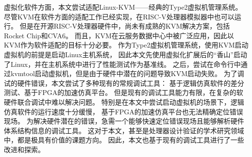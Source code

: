 虚拟化软件方面，本文尝试适配Linux-KVM——经典的Type2虚拟机管理系统。
尽管KVM在软件方面的适配工作已经实现，在RISC-V处理器模拟器中也可以运行。
但是在开源RISC-V处理器硬件中，尚未有成熟的KVM解决方案，包括Rocket Chip和CVA6。
而且，KVM在云服务数据中心中被广泛应用，因此以KVM作为软件适配的目标十分必要。
作为Type2虚拟机管理系统，使用KVM启动虚拟机的前提是启动Linux主机系统，
因此本文先使用虚拟化扩展后的“香山”启动了Linux，并在主机系统中进行了性能测试作为基准线。
之后，尝试在命令行中通过kvmtool启动虚拟机，但是由于硬件中潜在的问题导致KVM启动失败。
为了调试的硬件错误，本文尝试了多种现有的常规调试工具：
基于逻辑仿真软件的差分测试、基于FPGA的加速仿真平台。
但是现有的调试工具能力有限，在复杂的软硬件联合调试中难以解决问题。
特别是在本文中尝试启动虚拟机的场景下，逻辑仿真软件的运行速度十分缓慢，
基于FPGA的加速仿真平台也无法精确定位错误现场。
为解决硬件潜在的错误，急需一个能够快速定位错误现场且能够解析硬件体系结构信息的调试工具。
这对于本文，甚至是处理器设计验证的学术研究领域中，都是极具有价值的课题方向。
因此，本文也基于现有的调试工具进行了一些改进和探索。